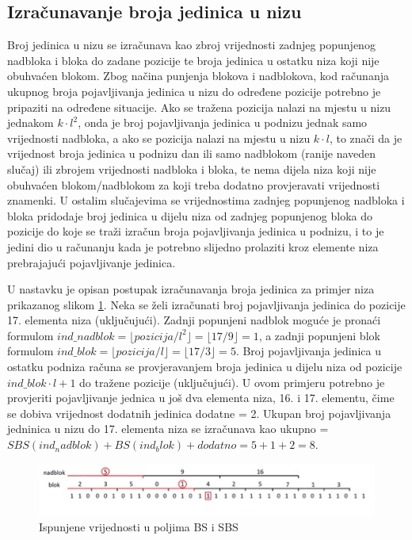 \subsection{Izračunavanje broja jedinica u nizu}
Broj jedinica u nizu se izračunava kao zbroj vrijednosti zadnjeg popunjenog nadbloka i bloka do zadane pozicije te broja jedinica u ostatku niza koji nije obuhvaćen blokom. Zbog načina punjenja blokova i nadblokova, kod računanja ukupnog broja pojavljivanja jedinica u nizu do određene pozicije potrebno je pripaziti na određene situacije. Ako se tražena pozicija nalazi na mjestu u nizu jednakom $k\cdot l^2$, onda je broj pojavljivanja jedinica u podnizu jednak samo vrijednosti nadbloka, a ako se pozicija nalazi na mjestu u nizu $k\cdot l$, to znači da je vrijednost broja jedinica u podnizu dan ili samo nadblokom (ranije naveden slučaj) ili zbrojem vrijednosti nadbloka i bloka, te nema dijela niza koji nije obuhvaćen blokom/nadblokom za koji treba dodatno provjeravati vrijednosti znamenki. U ostalim slučajevima se vrijednostima zadnjeg popunjenog nadbloka i bloka pridodaje broj jedinica u dijelu niza od zadnjeg popunjenog bloka do pozicije do koje se traži izračun broja pojavljivanja jedinica u podnizu, i to je jedini dio u računanju kada je potrebno slijedno prolaziti kroz elemente niza prebrajajući pojavljivanje jedinica.

U nastavku je opisan postupak izračunavanja broja jedinica za primjer niza prikazanog slikom \ref{rrr2}. Neka se želi izračunati broj pojavljivanja jedinica do pozicije 17. elementa niza (uključujući). Zadnji popunjeni nadblok moguće je pronaći formulom $ind\_nadblok = \lfloor pozicija/l^2 \rfloor = \lfloor 17/9 \rfloor = 1$, a zadnji popunjeni blok formulom $ind\_blok = \lfloor pozicija/l \rfloor = \lfloor 17/3 \rfloor = 5$. Broj pojavljivanja jedinica u ostatku podniza računa se provjeravanjem broja jedinica u dijelu niza od pozicije $ind\_blok\cdot l+1$ do tražene pozicije (uključujući). U ovom primjeru potrebno je provjeriti pojavljivanje jednica u još dva elementa niza, 16. i 17. elementu, čime se dobiva vrijednost dodatnih jedinica dodatne = 2. Ukupan broj pojavljivanja jedninica u nizu do 17. elementa niza se izračunava kao ukupno  = $SBS(ind_nadblok) + BS(ind_blok) + dodatno = 5 + 1 + 2 = 8$.

\begin{figure}[H]
\centering
\includegraphics[width=\linewidth]{./pictures/rrr2.jpg}
\caption{Ispunjene vrijednosti u poljima BS i SBS}\label{rrr2}
\end{figure}


